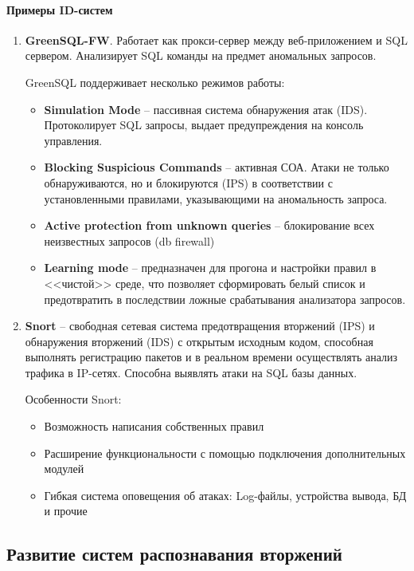 \paragraph{Примеры ID-систем}
\begin{enumerate}
	\item \textbf{GreenSQL-FW}. Работает как прокси-сервер между веб-приложением и SQL сервером. Анализирует SQL команды на предмет аномальных запросов.
	
	GreenSQL поддерживает несколько режимов работы:
	\begin{itemize}
		\item \textbf{Simulation Mode} -- пассивная система обнаружения атак (IDS). Протоколирует SQL запросы, выдает предупреждения на консоль управления.
		\item \textbf{Blocking Suspicious Commands} -- активная СОА. Атаки не только обнаруживаются, но и блокируются (IPS) в соответствии с установленными правилами, указывающими на аномальность запроса.
		\item \textbf{Active protection from unknown queries} -- блокирование всех неизвестных запросов (db firewall)
		\item \textbf{Learning mode} -- предназначен для прогона и настройки правил в <<чистой>> среде, что позволяет сформировать белый список и предотвратить в последствии ложные срабатывания анализатора запросов.
	\end{itemize}
	
	\item \textbf{Snort} -- свободная сетевая система предотвращения вторжений (IPS) и обнаружения вторжений (IDS) с открытым исходным кодом, способная выполнять регистрацию пакетов и в реальном времени осуществлять анализ трафика в IP-сетях. Способна выявлять атаки на SQL базы данных. 

	Особенности Snort:
	\begin{itemize}
		\item Возможность написания собственных правил
		\item Расширение функциональности с помощью подключения дополнительных модулей
		\item Гибкая система оповещения об атаках: Log-файлы, устройства вывода, БД и прочие
	\end{itemize}
	
\end{enumerate}

\subsection{Развитие систем распознавания вторжений}

